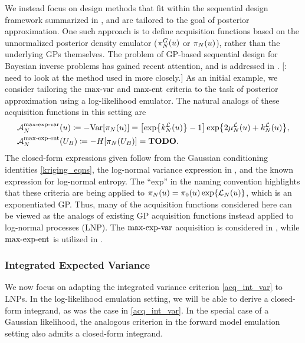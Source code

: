 \documentclass[12pt]{article}
\begin{document}
We instead focus on design methods that fit within the sequential design framework summarized in , and 
are tailored to the goal of posterior approximation. One such approach is to define acquisition functions based on 
the unnormalized posterior density emulator ($\fwdEmRdm[\Ndesign]{\postDens}(\Par)$ or $\llikEmRdmDens[\Ndesign](\Par)$), 
rather than the underlying GPs themselves. The problem of GP-based sequential design for Bayesian inverse problems  
has gained recent attention, and is addressed in 
\cite{SinsbeckNowak, Surer2023sequential, VehtariParallelGP, briol2017sampling, ranjan2016inverse, 
	landslideCalibration, KandasamyActiveLearning2015, Kandasamy_2017, wang2018adaptive,   
	weightedIVAR, quantileApprox, hydrologicalModel, briol2017sampling}. 
[\todo: need to look at the method used in \cite{quantileApprox, hydrologicalModel} more closely.]
As an initial example, we consider tailoring the $\maxvarLabel$ and $\maxentLabel$ criteria to the task of posterior approximation 
using a log-likelihood emulator. The natural analogs of these acquisition functions in this setting are 
\begin{align}
&\labelAcq[\Ndesign]{\maxexpvarLabel}(\Par) \Def -\Var[\llikEmRdmDens[\Ndesign](\Par)] 
= \left[\Exp{\emKer[\Ndesign]{\llik}(\Par)} - 1 \right] \Exp{2\emMean[\Ndesign]{\llik}(\Par) + \emKer[\Ndesign]{\llik}(\Par)}, \\ 
&\labelAcq[\Ndesign]{\maxexpentLabel}(\designBatchIn) \Def -\Ent[\llikEmRdmDens[\Ndesign](\designBatchIn)]
= \todo. \label{acq_max_exp_var_ent}
\end{align} 
The closed-form expressions given follow from the Gaussian conditioning identities \ref{kriging_eqns}, the log-normal 
variance expression in , and the known expression for log-normal entropy. 
The ``exp'' in the naming convention highlights that these criteria are being applied to
$\llikEmRdmDens[\Ndesign](\Par) = \priorDens(\Par) \Exp{\llikEm(\Par)}$, which is an exponentiated GP. 
Thus, many of the acquisition functions 
considered here can be viewed as the analogs of existing GP acquisition functions instead applied to log-normal 
processes (LNP). The $\maxexpvarLabel$ acquisition is considered in 
\cite{KandasamyActiveLearning2015, Kandasamy_2017}, 
while $\maxexpentLabel$ is utilized in \cite{wang2018adaptive, landslideCalibration}. 

\subsubsection{Integrated Expected Variance}
We now focus on adapting the integrated variance criterion \ref{acq_int_var} to LNPs. 
In the log-likelihood emulation 
setting, we will be able to derive a closed-form integrand, as was the case in \ref{acq_int_var}. In the special case 
of a Gaussian likelihood, the analogous criterion in the forward model emulation setting also admits a closed-form 
integrand. 
\end{document}
